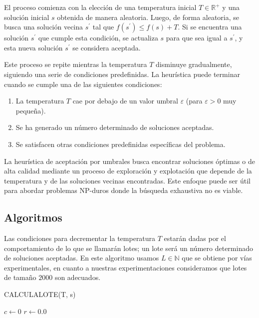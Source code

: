 \documentclass[spanish,12pt,letterpaper]{article}
\begin{document}
	El proceso comienza con la elección de una temperatura inicial $T \in \mathbb{R}^{+}$ y una solución inicial $s$ obtenida de manera aleatoria. Luego, de forma aleatoria, se busca una solución vecina $s^{\prime}$ tal que $f\left(s^{\prime}\right) \leq f(s) + T$. Si se encuentra una solución $s^{\prime}$ que cumple esta condición, se actualiza $s$ para que sea igual a $s^{\prime}$, y esta nueva solución $s^{\prime}$ se considera aceptada.
	
	Este proceso se repite mientras la temperatura $T$ disminuye gradualmente, siguiendo una serie de condiciones predefinidas. La heurística puede terminar cuando se cumple una de las siguientes condiciones:
	
	\begin{enumerate}
		\item La temperatura $T$ cae por debajo de un valor umbral $\varepsilon$ (para $\varepsilon > 0$ muy pequeña).
		\item Se ha generado un número determinado de soluciones aceptadas.
		\item Se satisfacen otras condiciones predefinidas específicas del problema.
	\end{enumerate}
	
	La heurística de aceptación por umbrales busca encontrar soluciones óptimas o de alta calidad mediante un proceso de exploración y explotación que depende de la temperatura y de las soluciones vecinas encontradas. Este enfoque puede ser útil para abordar problemas NP-duros donde la búsqueda exhaustiva no es viable.

	\subsection{Algoritmos}
	Las condiciones para decrementar la temperatura $T$ estarán dadas por el
	comportamiento de lo que se llamarán lotes; un lote será un número determinado de soluciones aceptadas. En este algoritmo usamos $L\in \mathbb{N}$ que se obtiene por vías experimentales, en cuanto a nuestras experimentaciones consideramos que lotes de tamaño $2000$ son adecuados.\\
	
	\begin{algorithm}[H]
		\caption{CALCULALOTE(T, s)}
		$c \leftarrow 0$\;
		$r \leftarrow 0.0$\;
	\end{algorithm}
	\hfill \break		
	
\end{document}
